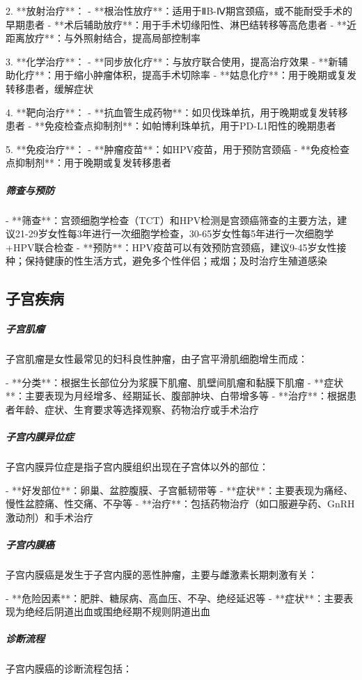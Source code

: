 \begin{enumerate}
2. **放射治疗**：
   - **根治性放疗**：适用于ⅡB-Ⅳ期宫颈癌，或不能耐受手术的早期患者
   - **术后辅助放疗**：用于手术切缘阳性、淋巴结转移等高危患者
   - **近距离放疗**：与外照射结合，提高局部控制率

3. **化学治疗**：
   - **同步放化疗**：与放疗联合使用，提高治疗效果
   - **新辅助化疗**：用于缩小肿瘤体积，提高手术切除率
   - **姑息化疗**：用于晚期或复发转移患者，缓解症状

4. **靶向治疗**：
   - **抗血管生成药物**：如贝伐珠单抗，用于晚期或复发转移患者
   - **免疫检查点抑制剂**：如帕博利珠单抗，用于PD-L1阳性的晚期患者

5. **免疫治疗**：
   - **肿瘤疫苗**：如HPV疫苗，用于预防宫颈癌
   - **免疫检查点抑制剂**：用于晚期或复发转移患者

\subparagraph{筛查与预防}

- **筛查**：宫颈细胞学检查（TCT）和HPV检测是宫颈癌筛查的主要方法，建议21-29岁女性每3年进行一次细胞学检查，30-65岁女性每5年进行一次细胞学+HPV联合检查
- **预防**：HPV疫苗可以有效预防宫颈癌，建议9-45岁女性接种；保持健康的性生活方式，避免多个性伴侣；戒烟；及时治疗生殖道感染

\subsection{子宫疾病}

\subparagraph{子宫肌瘤}

子宫肌瘤是女性最常见的妇科良性肿瘤，由子宫平滑肌细胞增生而成：

- **分类**：根据生长部位分为浆膜下肌瘤、肌壁间肌瘤和黏膜下肌瘤
- **症状**：主要表现为月经增多、经期延长、腹部肿块、白带增多等
- **治疗**：根据患者年龄、症状、生育要求等选择观察、药物治疗或手术治疗

\subparagraph{子宫内膜异位症}

子宫内膜异位症是指子宫内膜组织出现在子宫体以外的部位：

- **好发部位**：卵巢、盆腔腹膜、子宫骶韧带等
- **症状**：主要表现为痛经、慢性盆腔痛、性交痛、不孕等
- **治疗**：包括药物治疗（如口服避孕药、GnRH激动剂）和手术治疗

\subparagraph{子宫内膜癌}

子宫内膜癌是发生于子宫内膜的恶性肿瘤，主要与雌激素长期刺激有关：

- **危险因素**：肥胖、糖尿病、高血压、不孕、绝经延迟等
- **症状**：主要表现为绝经后阴道出血或围绝经期不规则阴道出血

\subparagraph{诊断流程}

子宫内膜癌的诊断流程包括：


\end{enumerate}
